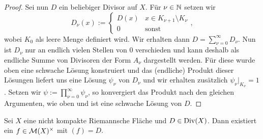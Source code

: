\begin{proof}
  Sei nun $D$ ein beliebiger Divisor auf $X$. Für $\nu \in \mathbb{N}$
  setzen wir
  \[
  D_\nu(x) := \begin{cases} D(x) & x \in K_{\nu+1}\setminus K_\nu\\ 0
    & \text{sonst}\end{cases}, 
  \]
  wobei $K_0$ als leere Menge definiert wird. Wir erhalten dann $D =
  \sum_{\nu = 0}^\infty D_\nu$. 
  Nun ist $D_\nu$ nur an endlich vielen Stellen von 0 verschieden und
  kann deshalb als endliche Summe von Divisoren der Form $A_\nu$
  dargestellt werden. Für diese wurde oben eine schwache Lösung
  konstruiert und das (endliche) Produkt dieser Lösungen liefert uns
  eine Lösung $\psi_\nu$ von $D_\nu$ und wir erhalten zusätzlich $\psi_\nu
  |_{K_\nu} = 1$. 
  Setzen wir $\psi := \prod_{\nu=0}^\infty \psi_\nu$, so
  konvergiert das Produkt nach den gleichen Argumenten, wie oben und
  ist eine schwache Lösung von $D$.
\end{proof}

\begin{thm}
  \label{thm:Lösung-Divisor}
  Sei $X$ eine nicht kompakte Riemannsche Fläche und $D \in
  \operatorname{Div}(X)$. Dann existiert ein $f \in \mathcal{M}(X)^\times$ mit $(f) = D$.
\end{thm}

